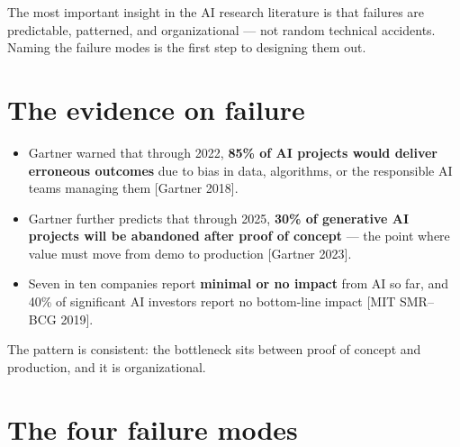 
The most important insight in the AI research literature is that failures are
predictable, patterned, and organizational — not random technical accidents.
Naming the failure modes is the first step to designing them out.

\section{The evidence on failure}

\begin{itemize}
  \item Gartner warned that through 2022, \textbf{85\% of AI projects would
        deliver erroneous outcomes} due to bias in data, algorithms, or the
        responsible AI teams managing them [Gartner 2018].
  \item Gartner further predicts that through 2025, \textbf{30\% of generative
        AI projects will be abandoned after proof of concept} — the point where
        value must move from demo to production [Gartner 2023].
  \item Seven in ten companies report \textbf{minimal or no impact} from AI so
        far, and 40\% of significant AI investors report no bottom-line impact
        [MIT SMR--BCG 2019].
\end{itemize}

The pattern is consistent: the bottleneck sits between proof of concept and
production, and it is organizational.

\section{The four failure modes}

\vspace{-0.3em}


